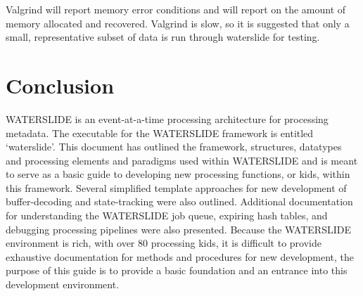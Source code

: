 \documentclass[11pt]{article}
\begin{document}
Valgrind will report memory error conditions and will report on the amount of 
memory allocated and recovered.  Valgrind is slow, so it is suggested that 
only a small, representative subset of data is run through waterslide for 
testing.

\section{Conclusion}
WATERSLIDE is an event-at-a-time processing architecture for processing metadata.
The executable for the WATERSLIDE framework is entitled `waterslide'.  This document
has outlined the framework, structures, datatypes and processing elements and 
paradigms used within WATERSLIDE and is meant to serve as a basic guide to 
developing new processing functions, or kids, within this framework.  Several 
simplified template approaches for new development of buffer-decoding and
state-tracking were also outlined.  Additional 
documentation for understanding the WATERSLIDE job queue, expiring hash tables, 
and debugging processing pipelines were also presented.  Because the WATERSLIDE 
environment is rich, with over 80 processing kids, it is difficult to provide 
exhaustive documentation for methods and procedures for new development, the 
purpose of this guide is to provide a basic foundation and an entrance into
this development environment.  
\end{document}
